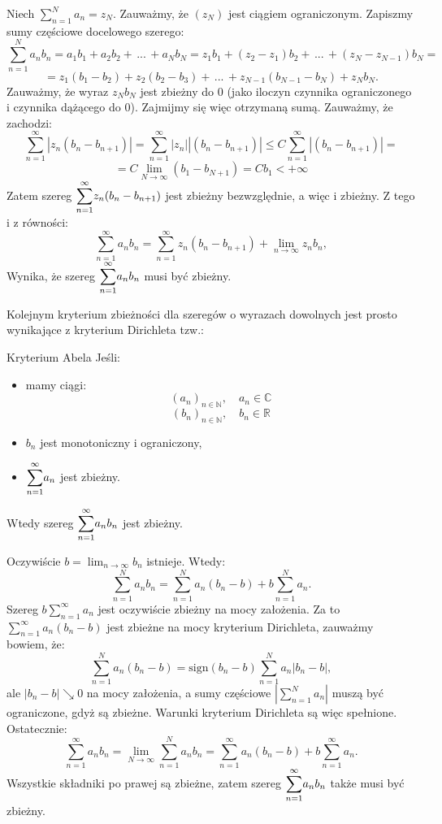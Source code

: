 \documentclass{article}
\numberwithin{defi}{section}
\numberwithin{defi}{section}
\newcommand{\R}{\mathbb{R}}
\newcommand{\N}{\mathbb{N}}
\newcommand{\C}{\mathbb{C}}
\newcommand{\oo}{\infty}
\begin{document}
\begin{dow}
    Niech $\sum_{n=1}^{N} a_n = z_N$. Zauważmy, że $(z_N)$ jest ciągiem ograniczonym. Zapiszmy sumy częściowe docelowego szerego:
    \[\sum_{n=1}^{N} a_n b_n = a_1 b_1 + a_2 b_2 + \, ... \, + a_N b_N = z_1 b_1 + (z_2 - z_1) b_2 + \, ... \, +  (z_N - z_{N-1}) b_N = \]
    \[ = z_1 (b_1 - b_2) + z_2 (b_2 - b_3) + \, ... \, + z_{N-1} (b_{N-1} - b_N) + z_N b_N.\]
    Zauważmy, że wyraz $z_N b_N$ jest zbieżny do 0 (jako iloczyn czynnika ograniczonego i czynnika dążącego do 0).
    Zajmijmy się więc otrzymaną sumą. Zauważmy, że zachodzi:
    \[\sum_{n=1}^{\oo} | z_n (b_n - b_{n+1} )| = \sum_{n=1}^{\oo} | z_n| | (b_n - b_{n+1} )| \leqslant  C \sum_{n=1}^{\oo} | (b_n - b_{n+1} )| =\]
    \[= C \lim_{N\to \oo} (b_1 - b_{N+1}) = C b_1 < + \oo\]
    Zatem szereg $\mathlarger{\sum}_{n=1}^{\oo} z_n ( b_n - b_{n+1})$ jest zbieżny bezwzględnie, a więc i zbieżny.
    Z tego i z równości:
    \[\sum_{n=1}^{\oo} a_n b_n = \sum_{n=1}^{\oo} z_n ( b_n - b_{n+1}) + \lim _{n \to \oo} z_n b_n, \]
    Wynika, że szereg $\mathlarger{\sum}_{n=1}^{\oo} a_n b_n$ musi być zbieżny.
\end{dow}
Kolejnym kryterium zbieżności dla szeregów o wyrazach dowolnych jest prosto wynikające z kryterium Dirichleta tzw.:
\begin{twier}{Kryterium Abela}
    Jeśli:
    \begin{itemize}
        \item mamy ciągi:
              \[(a_n)_{n\in \N}, \quad a_n \in \C \]
              \[(b_n)_{n\in \N}, \quad b_n \in \R\]
        \item $b_n$ jest monotoniczny i ograniczony,
        \item $\mathlarger{\sum}_{n=1}^{\oo} a_n$ jest zbieżny.
    \end{itemize}
    Wtedy szereg $\mathlarger{\sum}_{n=1}^{\oo} a_n b_n$ jest zbieżny.
\end{twier}
\begin{dow}
    Oczywiście $b = \lim _{n \to \oo} b_n$ istnieje. Wtedy:
    \[\sum_{n=1}^{N} a_n b_n =  \sum_{n=1}^{N} a_n (b_n - b) + b \sum_{n=1}^{N} a_n.\]
    Szereg $b \sum_{n=1}^{\oo} a_n$ jest oczywiście zbieżny na mocy założenia. Za to $\sum_{n=1}^{\oo} a_n (b_n - b)$ jest zbieżne na mocy kryterium Dirichleta, zauważmy bowiem, że:
    \[\sum_{n=1}^{N} a_n (b_n - b) = \text{sign}(b_n - b) \sum_{n=1}^{N} a_n |b_n - b|,\]
    ale $|b_n - b| \searrow 0$ na mocy założenia, a sumy częściowe $|\sum_{n=1}^{N} a_n|$ muszą być ograniczone, gdyż są zbieżne. Warunki kryterium Dirichleta są więc spełnione. Ostatecznie:
    \[\sum_{n=1}^{\oo} a_n b_n = \lim_{N \to \oo} \sum_{n=1}^{N} a_n b_n =  \sum_{n=1}^{\oo} a_n (b_n - b) + b \sum_{n=1}^{\oo} a_n.\]
    Wszystkie składniki po prawej są zbieżne, zatem szereg $\mathlarger{\sum}_{n=1}^{\oo} a_n b_n$ także musi być zbieżny.
\end{dow}
\end{document}

